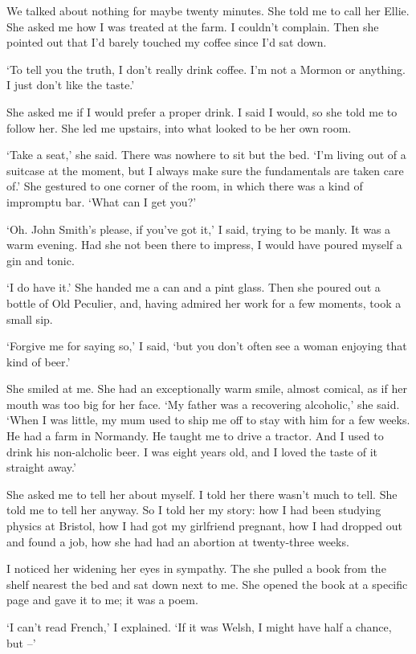 We talked about nothing for maybe twenty minutes. She told me to call her Ellie. She asked me how I was treated at the farm. I couldn't complain. Then she pointed out that I'd barely touched my coffee since I'd sat down.

`To tell you the truth, I don't really drink coffee. I'm not a Mormon or anything. I just don't like the taste.'

She asked me if I would prefer a proper drink. I said I would, so she told me to follow her. She led me upstairs, into what looked to be her own room.

`Take a seat,' she said. There was nowhere to sit but the bed. `I'm living out of a suitcase at the moment, but I always make sure the fundamentals are taken care of.' She gestured to one corner of the room, in which there was a kind of impromptu bar. `What can I get you?'

`Oh. John Smith's please, if you've got it,' I said, trying to be manly. It was a warm evening. Had she not been there to impress, I would have poured myself a gin and tonic.

`I do have it.' She handed me a can and a pint glass. Then she poured out a bottle of Old Peculier, and, having admired her work for a few moments, took a small sip.

`Forgive me for saying so,' I said, `but you don't often see a woman enjoying that kind of beer.'

She smiled at me. She had an exceptionally warm smile, almost comical, as if her mouth was too big for her face. `My father was a recovering alcoholic,' she said. `When I was little, my mum used to ship me off to stay with him for a few weeks. He had a farm in Normandy. He taught me to drive a tractor. And I used to drink his non-alcholic beer. I was eight years old, and I loved the taste of it straight away.'

She asked me to tell her about myself. I told her there wasn't much to tell. She told me to tell her anyway. So I told her my story: how I had been studying physics at Bristol, how I had got my girlfriend pregnant, how I had dropped out and found a job, how she had had an abortion at twenty-three weeks.

I noticed her widening her eyes in sympathy. The she pulled a book from the shelf nearest the bed and sat down next to me. She opened the book at a specific page and gave it to me; it was a poem.

`I can't read French,' I explained. `If it was Welsh, I might have half a chance, but --'

